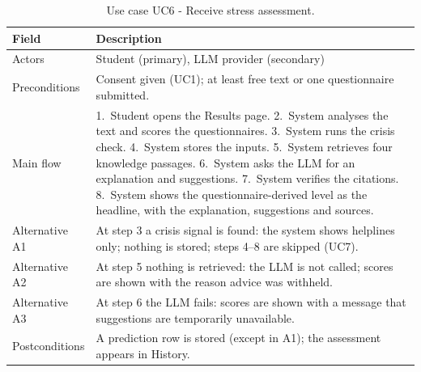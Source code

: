 \begin{table}[ht]
	\centering
	\caption{Use case UC6 - Receive stress assessment.}
	\label{tab:uc-main}
	\begin{tabularx}{\textwidth}{lL}
		\toprule
		Field          & Description \\ \midrule
		Actors         & Student (primary), LLM provider (secondary) \\
		Preconditions  & Consent given (UC1); at least free text or one questionnaire submitted. \\
		Main flow      & 1.~Student opens the Results page. 2.~System analyses the text and scores the questionnaires. 3.~System runs the crisis check. 4.~System stores the inputs. 5.~System retrieves four knowledge passages. 6.~System asks the LLM for an explanation and suggestions. 7.~System verifies the citations. 8.~System shows the questionnaire-derived level as the headline, with the explanation, suggestions and sources. \\
		Alternative A1 & At step 3 a crisis signal is found: the system shows helplines only; nothing is stored; steps 4--8 are skipped (UC7). \\
		Alternative A2 & At step 5 nothing is retrieved: the LLM is not called; scores are shown with the reason advice was withheld. \\
		Alternative A3 & At step 6 the LLM fails: scores are shown with a message that suggestions are temporarily unavailable. \\
		Postconditions & A prediction row is stored (except in A1); the assessment appears in History. \\ \bottomrule
	\end{tabularx}
\end{table}

